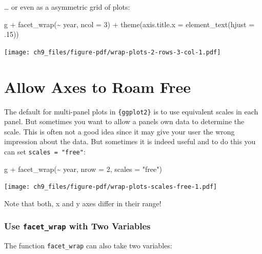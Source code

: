 \documentclass[
  letterpaper,
]{scrbook}
\newenvironment{Shaded}{\begin{snugshade}}{\end{snugshade}}
\newcommand{\AttributeTok}[1]{\textcolor[rgb]{0.40,0.45,0.13}{#1}}
\newcommand{\DecValTok}[1]{\textcolor[rgb]{0.68,0.00,0.00}{#1}}
\newcommand{\FunctionTok}[1]{\textcolor[rgb]{0.28,0.35,0.67}{#1}}
\newcommand{\NormalTok}[1]{\textcolor[rgb]{0.00,0.23,0.31}{#1}}
\newcommand{\SpecialCharTok}[1]{\textcolor[rgb]{0.37,0.37,0.37}{#1}}
\newcommand{\StringTok}[1]{\textcolor[rgb]{0.13,0.47,0.30}{#1}}
\begin{document}
\ldots{} or even as a asymmetric grid of plots:

\begin{Shaded}
\begin{Highlighting}[]
\NormalTok{g }\SpecialCharTok{+} \FunctionTok{facet\_wrap}\NormalTok{(}\SpecialCharTok{\textasciitilde{}}\NormalTok{ year, }\AttributeTok{ncol =} \DecValTok{3}\NormalTok{) }\SpecialCharTok{+} \FunctionTok{theme}\NormalTok{(}\AttributeTok{axis.title.x =} \FunctionTok{element\_text}\NormalTok{(}\AttributeTok{hjust =}\NormalTok{ .}\DecValTok{15}\NormalTok{))}
\end{Highlighting}
\end{Shaded}

\texttt{[image: ch9\_files/figure-pdf/wrap-plots-2-rows-3-col-1.pdf]}

\section{Allow Axes to Roam Free}\label{allow-axes-to-roam-free}

The default for multi-panel plots in \texttt{\{ggplot2\}} is to use
equivalent scales in each panel. But sometimes you want to allow a
panels own data to determine the scale. This is often not a good idea
since it may give your user the wrong impression about the data. But
sometimes it is indeed useful and to do this you can set
\texttt{scales\ =\ "free"}:

\begin{Shaded}
\begin{Highlighting}[]
\NormalTok{g }\SpecialCharTok{+} \FunctionTok{facet\_wrap}\NormalTok{(}\SpecialCharTok{\textasciitilde{}}\NormalTok{ year, }\AttributeTok{nrow =} \DecValTok{2}\NormalTok{, }\AttributeTok{scales =} \StringTok{"free"}\NormalTok{)}
\end{Highlighting}
\end{Shaded}

\texttt{[image: ch9\_files/figure-pdf/wrap-plots-scales-free-1.pdf]}

Note that both, x and y axes differ in their range!

\subsubsection{\texorpdfstring{Use \texttt{facet\_wrap} with Two
Variables}{Use facet\_wrap with Two Variables}}\label{use-facet_wrap-with-two-variables}

The function \texttt{facet\_wrap} can also take two variables:
\end{document}
